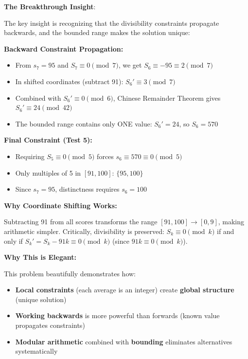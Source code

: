 \documentclass[11pt]{article}
\begin{document}
\begin{keyinsightbox}
\textbf{The Breakthrough Insight}:

The key insight is recognizing that the divisibility constraints propagate backwards, and the bounded range makes the solution unique:

\textbf{Backward Constraint Propagation:}
\begin{itemize}
    \item From $s_7 = 95$ and $S_7 \equiv 0 \pmod{7}$, we get $S_6 \equiv -95 \equiv 2 \pmod{7}$
    \item In shifted coordinates (subtract 91): $S_6' \equiv 3 \pmod{7}$
    \item Combined with $S_6' \equiv 0 \pmod{6}$, Chinese Remainder Theorem gives $S_6' \equiv 24 \pmod{42}$
    \item The bounded range contains only ONE value: $S_6' = 24$, so $S_6 = 570$
\end{itemize}

\textbf{Final Constraint (Test 5):}
\begin{itemize}
    \item Requiring $S_5 \equiv 0 \pmod{5}$ forces $s_6 \equiv 570 \equiv 0 \pmod{5}$
    \item Only multiples of 5 in $[91, 100]$: $\{95, 100\}$
    \item Since $s_7 = 95$, distinctness requires $s_6 = 100$
\end{itemize}

\textbf{Why Coordinate Shifting Works:}

Subtracting 91 from all scores transforms the range $[91, 100] \to [0, 9]$, making arithmetic simpler. Critically, divisibility is preserved: $S_k \equiv 0 \pmod{k}$ if and only if $S_k' = S_k - 91k \equiv 0 \pmod{k}$ (since $91k \equiv 0 \pmod{k}$).

\textbf{Why This is Elegant:}

This problem beautifully demonstrates how:
\begin{itemize}
    \item \textbf{Local constraints} (each average is an integer) create \textbf{global structure} (unique solution)
    \item \textbf{Working backwards} is more powerful than forwards (known value propagates constraints)
    \item \textbf{Modular arithmetic} combined with \textbf{bounding} eliminates alternatives systematically
\end{itemize}
\end{keyinsightbox}
\end{document}
